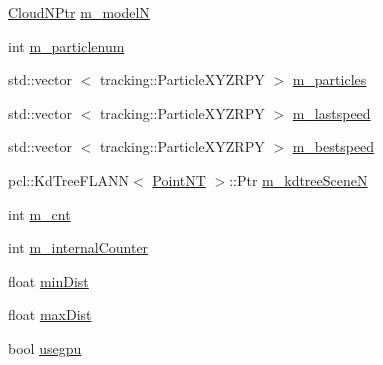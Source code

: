 \begin{DoxyCompactItemize}
\item 
\hyperlink{common_8h_ac29cd61ffd2436715a9b935fe2122703}{\-Cloud\-N\-Ptr} \hyperlink{class_particlepose_a6fcd5ba77748ec02218592201874bb75}{m\-\_\-model\-N}
\item 
int \hyperlink{class_particlepose_afbda237928cf27273f3c8e0ac8cb0d2f}{m\-\_\-particlenum}
\item 
std\-::vector\*
$<$ tracking\-::\-Particle\-X\-Y\-Z\-R\-P\-Y $>$ \hyperlink{class_particlepose_a6e0d2bdcd0131039227ccf35ef42d65e}{m\-\_\-particles}
\item 
std\-::vector\*
$<$ tracking\-::\-Particle\-X\-Y\-Z\-R\-P\-Y $>$ \hyperlink{class_particlepose_a0c1673111cdab70b548a9ce5a5cbf8bf}{m\-\_\-lastspeed}
\item 
std\-::vector\*
$<$ tracking\-::\-Particle\-X\-Y\-Z\-R\-P\-Y $>$ \hyperlink{class_particlepose_a555761b64f69c60d7633a30013e0e422}{m\-\_\-bestspeed}
\item 
pcl\-::\-Kd\-Tree\-F\-L\-A\-N\-N$<$ \hyperlink{common_8h_a4201c2c72d96e356cbee6fefdaf8da6a}{\-Point\-N\-T} $>$\-::\-Ptr \hyperlink{class_particlepose_ad68d6c6cb6c98cd908a3e9e903fdbac5}{m\-\_\-kdtree\-Scene\-N}
\item 
int \hyperlink{class_particlepose_aab1bfddc21050cc4e1ffedd146b4bbaa}{m\-\_\-cnt}
\item 
int \hyperlink{class_particlepose_aa4b1d0fe4fc48e68039ee1e9b2cb93dd}{m\-\_\-internal\-Counter}
\item 
float \hyperlink{class_particlepose_a827812bbc2da3926fd03c1a7e8e4e287}{min\-Dist}
\item 
float \hyperlink{class_particlepose_a5cbcf40f5baa980ff3d948e8f644fda1}{max\-Dist}
\item 
bool \hyperlink{class_particlepose_ac70adde4c1af0773ec887721283b98db}{usegpu}
\end{DoxyCompactItemize}


